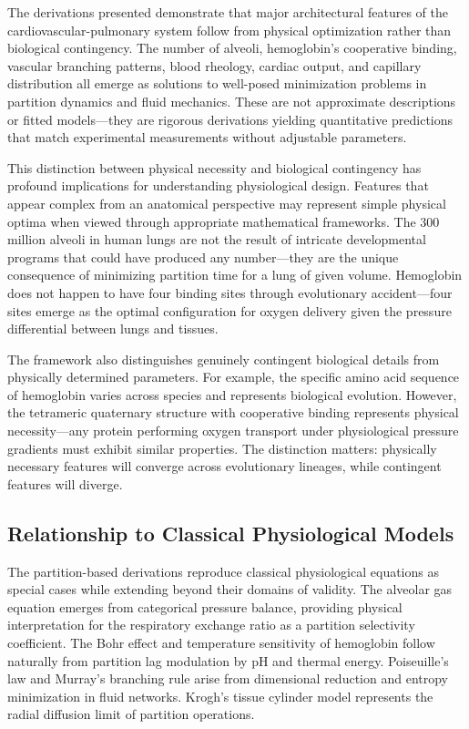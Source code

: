 \documentclass[12pt,a4paper]{article}
\theoremstyle{remark}
\begin{document}
The derivations presented demonstrate that major architectural features of the cardiovascular-pulmonary system follow from physical optimization rather than biological contingency. The number of alveoli, hemoglobin's cooperative binding, vascular branching patterns, blood rheology, cardiac output, and capillary distribution all emerge as solutions to well-posed minimization problems in partition dynamics and fluid mechanics. These are not approximate descriptions or fitted models—they are rigorous derivations yielding quantitative predictions that match experimental measurements without adjustable parameters.

This distinction between physical necessity and biological contingency has profound implications for understanding physiological design. Features that appear complex from an anatomical perspective may represent simple physical optima when viewed through appropriate mathematical frameworks. The 300 million alveoli in human lungs are not the result of intricate developmental programs that could have produced any number—they are the unique consequence of minimizing partition time for a lung of given volume. Hemoglobin does not happen to have four binding sites through evolutionary accident—four sites emerge as the optimal configuration for oxygen delivery given the pressure differential between lungs and tissues.

The framework also distinguishes genuinely contingent biological details from physically determined parameters. For example, the specific amino acid sequence of hemoglobin varies across species and represents biological evolution. However, the tetrameric quaternary structure with cooperative binding represents physical necessity—any protein performing oxygen transport under physiological pressure gradients must exhibit similar properties. The distinction matters: physically necessary features will converge across evolutionary lineages, while contingent features will diverge.

\subsection{Relationship to Classical Physiological Models}

The partition-based derivations reproduce classical physiological equations as special cases while extending beyond their domains of validity. The alveolar gas equation emerges from categorical pressure balance, providing physical interpretation for the respiratory exchange ratio as a partition selectivity coefficient. The Bohr effect and temperature sensitivity of hemoglobin follow naturally from partition lag modulation by pH and thermal energy. Poiseuille's law and Murray's branching rule arise from dimensional reduction and entropy minimization in fluid networks. Krogh's tissue cylinder model represents the radial diffusion limit of partition operations.
\end{document}
